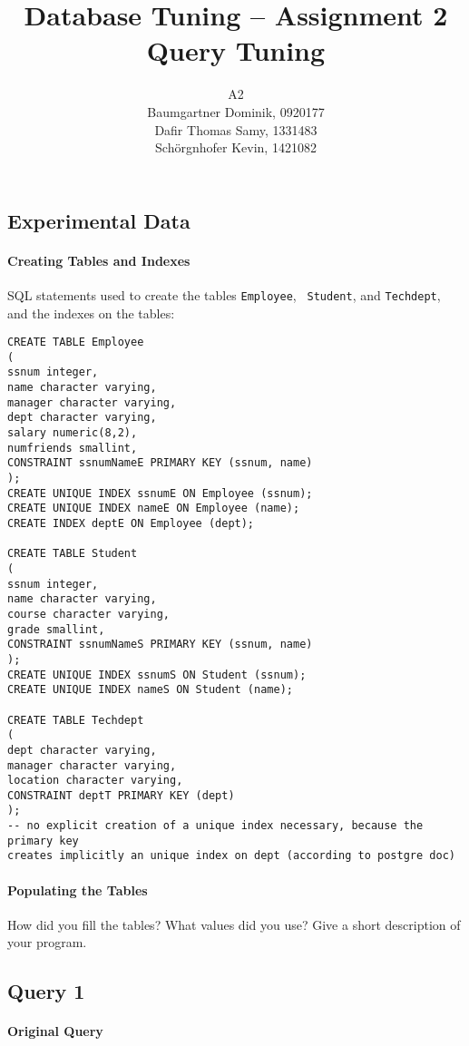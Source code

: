 \documentclass[11pt]{scrartcl}
\title{
  \textbf{\large Database Tuning -- Assignment 2}\\
  Query Tuning
}
\author{
 A2\\
\large Baumgartner Dominik, 0920177 \\
\large Dafir Thomas Samy, 1331483 \\
\large Sch\"orgnhofer Kevin, 1421082
}
\begin{document}
\maketitle

\subsection*{Experimental Data}

\paragraph{Creating Tables and Indexes}

SQL statements used to create the tables {\tt Employee}, {\tt
  Student}, and {\tt Techdept}, and the indexes on the tables:

{\small
\begin{verbatim}
CREATE TABLE Employee 
(
ssnum integer,
name character varying,
manager character varying,
dept character varying,
salary numeric(8,2),
numfriends smallint,
CONSTRAINT ssnumNameE PRIMARY KEY (ssnum, name)
);
CREATE UNIQUE INDEX ssnumE ON Employee (ssnum);
CREATE UNIQUE INDEX nameE ON Employee (name);
CREATE INDEX deptE ON Employee (dept);

CREATE TABLE Student 
(
ssnum integer,
name character varying,
course character varying,
grade smallint,
CONSTRAINT ssnumNameS PRIMARY KEY (ssnum, name)
);
CREATE UNIQUE INDEX ssnumS ON Student (ssnum);
CREATE UNIQUE INDEX nameS ON Student (name);

CREATE TABLE Techdept
(
dept character varying,
manager character varying,
location character varying,
CONSTRAINT deptT PRIMARY KEY (dept)
);
-- no explicit creation of a unique index necessary, because the primary key
creates implicitly an unique index on dept (according to postgre doc)
\end{verbatim}
}

\paragraph{Populating the Tables}

How did you fill the tables? What values did you use? Give a short
description of your program.

\subsection*{Query 1}

\paragraph{Original Query}
\end{document}
